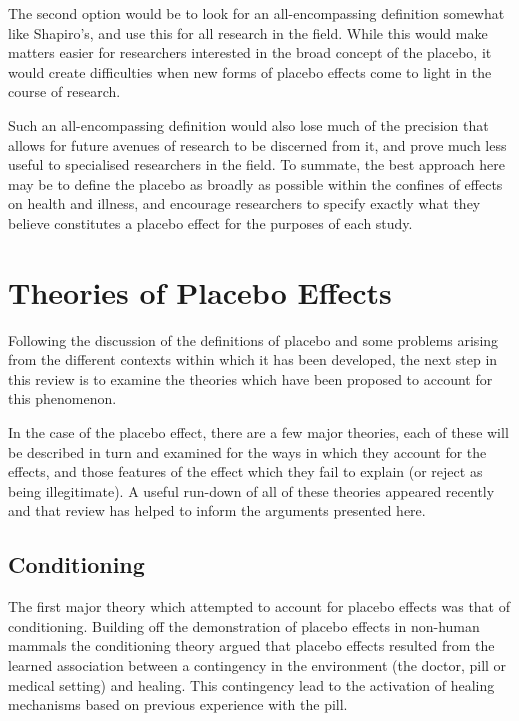 The second option would be to look for an all-encompassing definition somewhat like Shapiro's, and use this for all research in the field. While this would make matters easier for researchers interested in the broad concept of the placebo, it would create difficulties when new forms of placebo effects come to light in the course of research. 

Such an all-encompassing definition would also lose much of the precision that allows for future avenues of research to be discerned from it, and prove much less useful to specialised researchers in the field. To summate, the best approach here may be to define the placebo as broadly as possible within the confines of effects on health and illness, and encourage researchers to specify exactly what they believe constitutes a placebo effect for the purposes of each study.


\section{Theories of Placebo Effects}
\label{sec:theor-plac-effects}

Following the discussion of the definitions of placebo and some problems arising from the different contexts within which it has been developed, the next step in this review is to examine the theories which have been proposed to account for this phenomenon. 

In the case of the placebo effect, there are a few major theories, each of these will be described in turn  and examined for the ways in which they account for the effects, and those features of the effect which they fail to explain (or reject as being illegitimate). A useful run-down of all of these theories appeared recently \cite{Stewart-Williams2004b} and that review has helped to inform the arguments presented here. 

\subsection{Conditioning}
\label{sec:conditioning}



The first major theory which attempted to account for placebo effects was that of conditioning. Building off the demonstration of placebo effects in non-human mammals \cite{Herrnstein1962} the conditioning theory argued that placebo effects resulted from the learned association between a contingency in the environment (the doctor, pill or medical setting) and healing. This contingency lead to the activation of healing mechanisms based on previous experience with the pill. 

